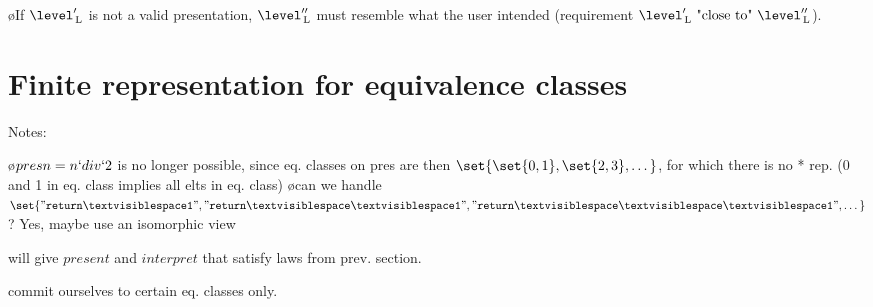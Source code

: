 %
%
%


\bl
\o If $\level'\L$ is not a valid presentation, $\level''\L$ must resemble what the user intended (requirement $\level'\L~\text{"close to"}~\level''\L$).
\el






%																
%																
%																
\section{Finite representation for equivalence classes} \label{sect:finiteRep}

Notes:

\bl
\o $pres n = n `div` 2$ is no longer possible, since eq. classes on pres are then $\set{\set{0,1},\set{2,3}, \dots }$, for which there is no * rep. (0 and 1 in eq. class implies all elts in eq. class)
\o can we handle $\set{ {\tt "return\spc1" },{\tt "return\spc\spc1" }, {\tt "return\spc\spc\spc1" }, \dots}$? Yes, maybe use an isomorphic view 
\el 

will give $present$ and $interpret$ that satisfy laws from prev. section.

commit ourselves to certain eq. classes only.




